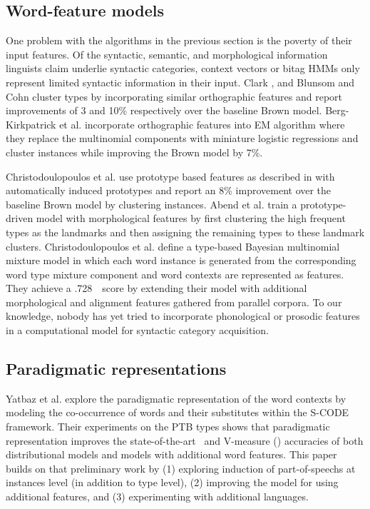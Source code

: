 \subsection{Word-feature models}
One problem with the algorithms in the previous section is the poverty
of their input features.  Of the syntactic, semantic, and
morphological information linguists claim underlie syntactic categories,
context vectors or bitag HMMs only represent limited syntactic information in
their input.  Clark , and Blunsom and
Cohn  cluster types by incorporating
similar orthographic features and report improvements of 3 and 10\%
respectively over the baseline Brown model.  Berg-Kirkpatrick et al.
 incorporate orthographic features
into EM algorithm where they replace the multinomial components with miniature
logistic regressions and cluster instances while improving the Brown model by 7\%.

Christodoulopoulos et
al.  use
prototype based features as described in
\cite{Haghighi:2006:PLS:1220835.1220876} with automatically induced
prototypes and report an 8\% improvement over the baseline Brown model
by clustering instances.  Abend et
al.  train a
prototype-driven model with morphological features by first clustering
the high frequent types as the landmarks and then assigning the
remaining types to these landmark clusters.  Christodoulopoulos et
al. 
define a type-based Bayesian multinomial mixture model in which each
word instance is generated from the corresponding word type mixture
component and word contexts are represented as features.  They achieve
a .728\ \mto\ score by extending their model with additional
morphological and alignment features gathered from parallel corpora.
To our knowledge, nobody has yet tried to incorporate phonological or
prosodic features in a computational model for syntactic category
acquisition.

\subsection{Paradigmatic representations}

Yatbaz et al.  explore
the paradigmatic representation of the word contexts by modeling the
co-occurrence of words and their substitutes within the S-CODE
framework.  Their experiments on the PTB types shows that paradigmatic
representation improves the state-of-the-art \mto\ and V-measure (\vm)
accuracies of both distributional models and models with additional
word features.  This paper builds on that preliminary work by
(1) exploring induction of part-of-speechs at instances level (in addition
to type level), (2) improving the model for using additional features,
and (3) experimenting with additional languages.


